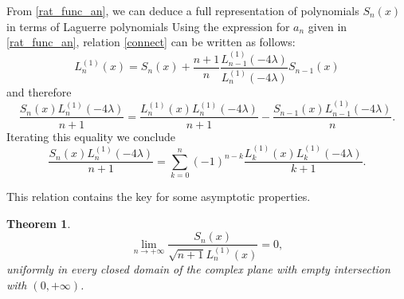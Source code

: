 \documentclass[reqno,10pt]{amsart}
\theoremstyle{plain}
\newtheorem{theorem}{Theorem}[section]
\numberwithin{equation}{section}
\numberwithin{figure}{section}
\begin{document}
\medskip

From \eqref{rat_func_an}, we can deduce a full representation of 
polynomials $S_{n}(x)$ in terms of Laguerre polynomials
Using the expression for $a_n$ given in \eqref{rat_func_an}, relation \eqref{connect} can be written as follows:
$$
L_{n}^{(1)} (x)= S_{n}(x) +
\frac{n+1}{n}
\frac{L^{(1)}_{n-1}(-4\lambda)}{L^{(1)}_{n}(-4\lambda)}
S_{n-1}(x)
$$
and therefore
\begin{equation} \label{Sn-Ln}
\frac{S_{n}(x)L^{(1)}_{n}(-4\lambda)}{n+1}  = \frac{L_{n}^{(1)}(x)L^{(1)}_{n}(-4\lambda)}{n+1} -
\frac{S_{n-1}(x)L^{(1)}_{n-1}(-4\lambda)}{n}.
\end{equation}
Iterating this equality we conclude
\begin{equation} \label{Sn-Ln_full}
\frac{S_{n}(x)L^{(1)}_{n}(-4\lambda)}{n+1} =  \sum_{k=0}^{n} (-1)^{n-k} \frac{L_{k}^{(1)}(x)L^{(1)}_{k}(-4\lambda)}{k+1}.
\end{equation}

\medskip

This relation contains the key for some asymptotic properties.

\begin{theorem}
\begin{equation} \label{asymp_Sn}
\lim_{n\rightarrow+\infty}\frac{S_{n}(x)}{\sqrt{n+1}L^{(1)}_{n}(x)} = 0,
\end{equation}
uniformly in every closed domain of the complex plane with
empty intersection with $(0,+\infty)$.
\end{theorem}
\end{document}
